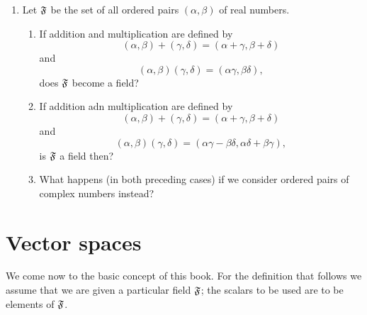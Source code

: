 {\begin{enumerate}[wide]
    \item Let \(\mathfrak{F}\) be the set of all ordered pairs \((\alpha, \beta)\) of real numbers.
    \begin{enumerate}[label=(\alph*), wide, nosep]
        \item If addition and multiplication are defined by
        \begin{equation*}
            (\alpha, \beta) + (\gamma, \delta) = (\alpha + \gamma, \beta + \delta)
        \end{equation*}
        and
        \begin{equation*}
            (\alpha, \beta)(\gamma, \delta) = (\alpha\gamma, \beta\delta),
        \end{equation*}
        does \(\mathfrak{F}\) become a field?
        \item If addition adn multiplication are defined by
        \begin{equation*}
            (\alpha, \beta) + (\gamma, \delta) = (\alpha + \gamma, \beta + \delta)
        \end{equation*}
        and
        \begin{equation*}
            (\alpha, \beta)(\gamma, \delta) = (\alpha\gamma - \beta\delta, \alpha\delta + \beta\gamma),
        \end{equation*}
        is \(\mathfrak{F}\) a field then?
        \item What happens (in both preceding cases) if we consider ordered
        pairs of complex numbers instead?
    \end{enumerate}
\end{enumerate}
}

\section{Vector spaces}\label{sec-vector-spaces}

We come now to the basic concept of this book. For the definition that follows we assume that we are given a particular field \(\mathfrak{F}\); the scalars to be used are to be elements of \(\mathfrak{F}\).

